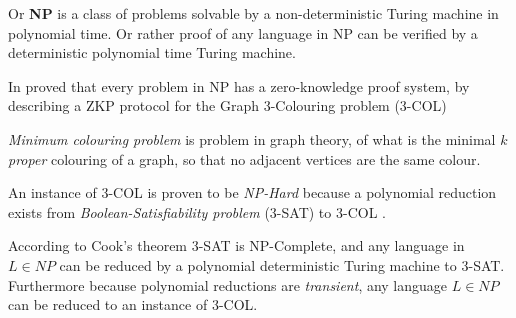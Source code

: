 Or \textbf{NP} is a class of problems solvable by a non-deterministic Turing machine in polynomial time. Or rather proof of any language in NP can be verified by a deterministic polynomial time Turing machine.

\bigskip

In \cite{GMW} proved that every problem in NP has a zero-knowledge proof system, by describing a ZKP protocol for the Graph 3-Colouring problem (3-COL)

\textit{Minimum colouring problem} is problem in graph theory, of what is the minimal $k$ \textit{proper} colouring of a graph, so that no adjacent vertices are the same colour.

An instance of 3-COL is proven to be \textit{NP-Hard} because a polynomial reduction exists from \textit{Boolean-Satisfiability problem} (3-SAT) to 3-COL \cite{mouatadid2014introduction}.

According to Cook's theorem \cite{cook1971complexity} 3-SAT is NP-Complete, and any language in $L \in NP$ can be reduced by a polynomial deterministic Turing machine to 3-SAT. Furthermore because polynomial reductions are \textit{transient}, any language $L \in NP$ can be reduced to an instance of 3-COL.
